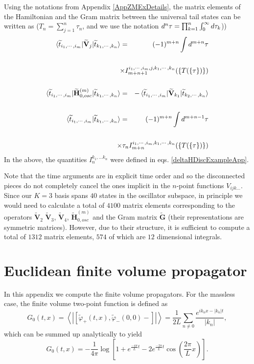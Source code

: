 \documentclass[twocolumn,secnumarabic,amssymb, nobibnotes, aps, prd]{revtex4-2}
\newcommand{\be}{\begin{equation}}
\newcommand{\ee}{\end{equation}}
\begin{document}
Using the notations from Appendix \ref{AppZMExDetails}, the matrix elements of the Hamiltonian and the Gram matrix between the universal tail states can be written as ($T_n=\sum_{j=1}^n \tau_n$, and we use the notation $d^n\tau=\prod_{k=1}^{n} \intop_{0}^{\infty} d\tau_k$))
\begin{eqnarray}
\braket{\widetilde{t}_{i_1,\cdots,i_m}|\widetilde{\mathbf{V}}_j|\widetilde{t}_{k_1,\cdots,k_n}} &=& (-1)^{m+n}\intop d^{m+n}\tau\cr\cr 
&&\hskip -1.in \times I_{m+n+1}^{i_1,\cdots,i_m,j,k_1,\cdots,k_n}(\{T(\{\tau\})\})\cr\cr
\braket{\widetilde{t}_{i_1,\cdots,i_m}|\widetilde{\mathbf{H}}_{0,osc}^{(m)}|\widetilde{t}_{k_1,\cdots,k_n}} &=& -\braket{\widetilde{t}_{i_1,\cdots,i_m}|\widetilde{\mathbf{V}}_{k_1}|\widetilde{t}_{k_2,\cdots,k_n}}\cr\cr
\braket{\widetilde{t}_{i_1,\cdots,i_m}|\widetilde{t}_{k_1,\cdots,k_n}} &=& (-1)^{m+n}\intop d^{m+n-1}\tau\cr\cr 
&&\hskip -1.in \times \tau_{n}I_{m+n}^{i_1,\cdots,i_m,k_1,\cdots,k_n}(\{T(\{\tau\})\})
\end{eqnarray}
In the above, the quantities $I_{n}^{k_1,\dots k_n}$ were defined in eqs. \eqref{deltaHDiscExampleApp}.

Note that the time arguments are in explicit time order and so the disconnected pieces do not completely cancel the ones implicit in the $n$-point functions $V_{ijk\dots}$. 
Since our $K=3$ basis spans $40$ states in the oscillator subspace, in principle we would need to calculate a total of $4100$ matrix elements corresponding to the operators $\widetilde{\mathbf{V}}_2$ $\widetilde{\mathbf{V}}_3$, $\widetilde{\mathbf{V}}_4$, $\widetilde{\mathbf{H}}_{0,osc}^{(m)}$ and the Gram matrix $\widetilde{\mathbf{G}}$ (their representations are symmetric matrices). However, due to their structure, it is sufficient to compute a total of $1312$ matrix elements, $574$ of which are $12$ dimensional integrals. 


\section{Euclidean finite volume propagator} \label{AppFVprop}
In this appendix we compute the finite volume propagators.
For the massless case, the finite volume two-point function is defined as
\be
G_0(t,x)=\left\langle\left|\left[\tilde\varphi_+(t,x),\tilde\varphi_-(0,0)-\right]\right|\right\rangle
=\frac{1}{2L}\sum_{n\neq 0} \frac{e^{i k_n x- |k_n| t}}{|k_n|},
\ee
which can be summed up analytically to yield
\be
G_0(t,x)=-\frac{1}{4\pi}\log\left[1+e^{\frac{-4\pi}{L} t}-2e^{\frac{-2\pi}{L} t}\cos\left(\frac{2\pi}{L} x\right)\right].
\ee
\end{document}
